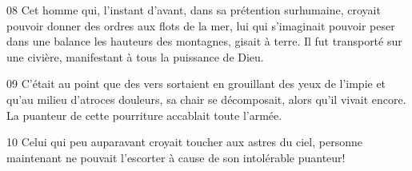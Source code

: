 
08 Cet homme qui, l’instant d’avant, dans sa prétention surhumaine, croyait pouvoir donner des ordres aux flots de la mer, lui qui s’imaginait pouvoir peser dans une balance les hauteurs des montagnes, gisait à terre. Il fut transporté sur une civière, manifestant à tous la puissance de Dieu.

09 C’était au point que des vers sortaient en grouillant des yeux de l’impie et qu’au milieu d’atroces douleurs, sa chair se décomposait, alors qu’il vivait encore. La puanteur de cette pourriture accablait toute l’armée.

10 Celui qui peu auparavant croyait toucher aux astres du ciel, personne maintenant ne pouvait l’escorter à cause de son intolérable puanteur!